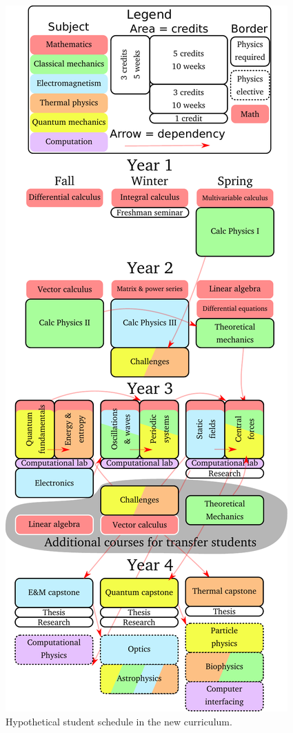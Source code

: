 \documentclass[english,aps,pra,reprint,noshowpacs,superscriptaddress]{revtex4-1}
\begin{document}
\begin{figure}
\includegraphics[width=\columnwidth]{vertical-schedule}
\caption{Hypothetical student schedule in the new curriculum.\label{fig:vertical-schedule}}
\end{figure}
\end{document}

